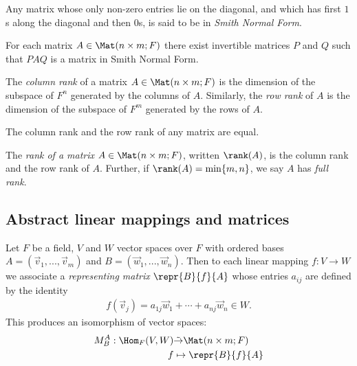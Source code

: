 \documentclass{article}
\begin{document}
\begin{definition}
	Any matrix whose only non-zero entries lie on the diagonal, and which has
	first $1$s along the diagonal and then $0$s, is said to be in \emph{Smith Normal Form}.
\end{definition}

\begin{theorem}[Theorem 2.2.5]
	For each matrix $A\in\Mat(n\times m;F)$ there exist invertible matrices $P$
	and $Q$ such that $PAQ$ is a matrix in Smith Normal Form.
\end{theorem}

\begin{definition}
	The \emph{column rank} of a matrix $A\in\Mat(n\times m;F)$ is the dimension of
	the subspace of $F^n$ generated by the columns of $A$. Similarly, the \emph{row
		rank} of $A$ is the dimension of the subspace of $F^m$ generated by the rows
	of $A$.
\end{definition}

\begin{theorem}[Theorem 2.2.8]
	The column rank and the row rank of any matrix are equal.
\end{theorem}

\begin{definition}
	The \emph{rank of a matrix} $A\in\Mat(n\times m;F)$, written $\rank(A)$, is the column rank and the
	row rank of $A$. Further, if $\rank(A) = \min\{m,n\}$, we say $A$ has
	\emph{full rank}.
\end{definition}

\subsection{Abstract linear mappings and matrices}

\begin{theorem}[Theorem 2.3.1]
	Let $F$ be a field, $V$ and $W$ vector spaces over $F$ with ordered bases $A=(\vec v_1,...,\vec v_m)$
	and $B=(\vec w_1,...,\vec w_n)$. Then to each linear mapping $f:V\to W$ we associate a
	\emph{representing matrix} $\repr{B}{f}{A}$ whose entries $a_{ij}$ are defined by the
	identity
	\begin{align*}
		f(\vec v_j) = a_{1j}\vec w_1 + \cdots + a_{nj}\vec w_n \in W.
	\end{align*}
	This produces an isomorphism of vector spaces:
	\begin{align*}
		M^A_B:\Hom_F(V,W) & \tilde\to \Mat(n\times m; F) \\
		f                 & \mapsto \repr{B}{f}{A}
	\end{align*}
\end{theorem}
\end{document}
